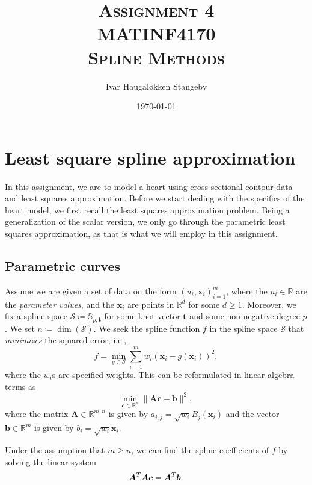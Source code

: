\documentclass[article]{memoir}
\title{\textsc{Assignment 4 \\ 
               MATINF4170 \\
       Spline Methods}}
\author{Ivar Haugal{\o}kken Stangeby}
\date{\today}
\newcommand{\x}{\mathbf{x}}
\newcommand{\R}{\mathbb{R}}
\renewcommand{\t}{\mathbf{t}}
\renewcommand{\c}{\boldsymbol{c}}
\newcommand{\A}{\boldsymbol{A}}
\renewcommand{\b}{\boldsymbol{b}}
\renewcommand{\S}{\mathcal{S}}
\begin{document}
\maketitle

\tableofcontents
\chapter{Least square spline approximation}

In this assignment, we are to model a heart using cross sectional contour data
and least squares approximation. Before we start dealing with the specifics of
the heart model, we first recall the least squares approximation problem.
Being a generalization of the scalar version, we only go through the parametric
least squares approximation, as that is what we will employ in this assignment.

\section{Parametric curves}
\label{sec:para_curves}
Assume we are given a set of data on the form \((u_i, \x_i)_{i = 1}^{m}\),
where the \( u_i \in \R \) are the \emph{parameter values}, and the \( \x_i \)
are points in \( \R^d \) for some \( d \geq 1 \). Moreover, we fix a spline
space \(\S \coloneqq \mathbb{S}_{p, \t}\) for some knot vector \(\t\) and some
non-negative degree \( p \).  We set \( n \coloneqq \dim(\S)\).  We seek the
spline function \( f \) in the spline space \(\S\) that \emph{minimizes} the
squared error, i.e., 
\begin{equation} 
    \label{eq:least_squares_problem}
    f = \min_{g \in \S} \sum^{m}_{i=1} w_i (\x_i - g(\x_i))^2,
\end{equation}
where the \(w_i\)s are specified weights. This can be reformulated in linear
algebra terms as
\begin{equation}
    \label{eq:least_quares_linalg}
    \min_{\c \in \R^n} \| \A\c - \b \|^2, 
\end{equation}
where the matrix \( \A \in \R^{m, n} \) is given by \( a_{i, j} =
\sqrt{w_i}B_j(\x_i) \) and the vector \( \b \in \R^m \) is given by \( b_i =
\sqrt{w_i}\x_i \).

Under the assumption that \( m \geq n \), we can find the spline coefficients
of \( f \) by solving the linear system
\begin{equation}
    \notag
    \A^T\A\c = \A^T\b.
\end{equation}
\end{document}
